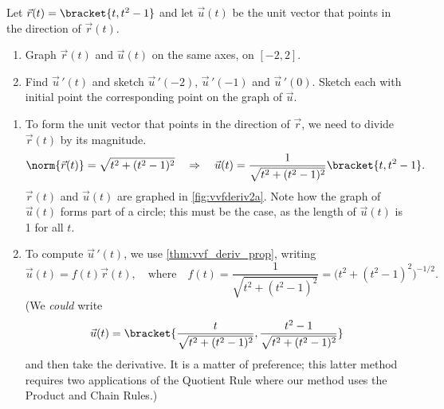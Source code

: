 \begin{example}\label{ex_vvfderiv2}%
Let $\vec r(t) =\bracket{t, t^2-1}$ and let $\vec u(t)$ be the unit vector that points in the direction of $\vec r(t)$.
\begin{enumerate}
	\item Graph $\vec r(t)$ and $\vec u(t)$ on the same axes, on $[-2,2]$.
	\item	Find $\vec u\,'(t)$ and sketch $\vec u\,'(-2)$, $\vec u\,'(-1)$ and $\vec u\,'(0)$. Sketch each with initial point the corresponding point on the graph of $\vec u$.
\end{enumerate}
\solution
\begin{enumerate}
	\item To form the unit vector that points in the direction of $\vec r$, we need to divide $\vec r(t)$ by its magnitude. 
	\[\norm{\vec r(t)} = \sqrt{t^2+(t^2-1)^2} \quad \Rightarrow \quad \vec u(t) = \frac{1}{\sqrt{t^2+(t^2-1)^2}}\bracket{t,t^2-1}.\]
%
	$\vec r(t)$ and $\vec u(t)$ are graphed in \autoref{fig:vvfderiv2a}. Note how the graph of $\vec u(t)$ forms part of a circle; this must be the case, as the length of $\vec u(t)$ is 1 for all $t$.

	\item		To compute $\vec u\,'(t)$, we use \autoref{thm:vvf_deriv_prop}, writing
	\[\vec u(t) = f(t)\vec r(t),\quad  \text{where}\quad f(t) = \frac{1}{\sqrt{t^2+(t^2-1)^2}}=\bigl(t^2+(t^2-1)^2\bigr)^{-1/2}.\]
	(We \emph{could} write
	\[\vec u(t) =\bracket{\frac{t}{\sqrt{t^2+(t^2-1)^2}}, \frac{t^2-1}{\sqrt{t^2+(t^2-1)^2}}}\]
	and then take the derivative. It is a matter of preference; this latter method requires two applications of the Quotient Rule where our method uses the Product and Chain Rules.)
	

\end{enumerate}
\end{example}
